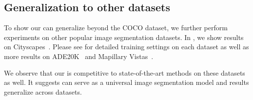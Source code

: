 \subsection{Generalization to other datasets}
To show our \modelname can generalize beyond the COCO dataset, we further perform experiments on other popular image segmentation datasets. In , we show results on Cityscapes~\cite{Cordts2016Cityscapes}. Please see  for detailed training settings on each dataset as well as more results on  ADE20K~\cite{zhou2017ade20k} and Mapillary Vistas~\cite{neuhold2017mapillary}.

We observe that our \modelname is competitive to state-of-the-art methods on these datasets as well. It suggests \modelname can serve as a universal image segmentation model and results generalize across datasets.

